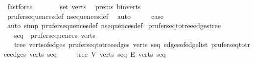 \begin{isabellebody}
\ fastforce\isanewline
\ \ \isamarkupfalse%
\ \isamarkupfalse%
\ {\isachardoublequoteopen}{\isasymdots}\ {\isacharequal}{\kern0pt}\ set\ verts{\isachardoublequoteclose}\ \isamarkupfalse%
\ {\isachardoublequoteopen}{}{\isachardot}{\kern0pt}prems{\isachardoublequoteclose}{\isacharparenleft}{\kern0pt}{}{\isacharparenright}{\kern0pt}\ b{\isacharunderscore}{\kern0pt}in{\isacharunderscore}{\kern0pt}verts\ \isamarkupfalse%
\ prufer{\isacharunderscore}{\kern0pt}sequences{\isacharunderscore}{\kern0pt}def\ n{\isacharunderscore}{\kern0pt}sequences{\isacharunderscore}{\kern0pt}def\ \isamarkupfalse%
\ auto\isanewline
\ \ \isamarkupfalse%
\ \isamarkupfalse%
\ {\isacharquery}{\kern0pt}case\ \isacommand{{\isachardot}{\kern0pt}}\isamarkupfalse%
\isanewline
{}\isamarkupfalse%
\ {\isacharparenleft}{\kern0pt}auto\ simp{\isacharcolon}{\kern0pt}\ prufer{\isacharunderscore}{\kern0pt}sequences{\isacharunderscore}{\kern0pt}def\ n{\isacharunderscore}{\kern0pt}sequences{\isacharunderscore}{\kern0pt}def{\isacharparenright}{\kern0pt}%
\endisatagproof
{\isafoldproof}%
%
\isadelimproof
\isanewline
%
\endisadelimproof
\isanewline
{}\isamarkupfalse%
\ prufer{\isacharunderscore}{\kern0pt}seq{\isacharunderscore}{\kern0pt}to{\isacharunderscore}{\kern0pt}tree{\isacharunderscore}{\kern0pt}edges{\isacharunderscore}{\kern0pt}tree{\isacharcolon}{\kern0pt}\isanewline
\ \ \ {\isachardoublequoteopen}seq\ {\isasymin}\ prufer{\isacharunderscore}{\kern0pt}sequences\ verts{\isachardoublequoteclose}\isanewline
\ \ \ {\isachardoublequoteopen}tree\ {\isacharparenleft}{\kern0pt}verts{\isacharunderscore}{\kern0pt}of{\isacharunderscore}{\kern0pt}edges\ {\isacharparenleft}{\kern0pt}prufer{\isacharunderscore}{\kern0pt}seq{\isacharunderscore}{\kern0pt}to{\isacharunderscore}{\kern0pt}tree{\isacharunderscore}{\kern0pt}edges\ verts\ seq{\isacharparenright}{\kern0pt}{\isacharparenright}{\kern0pt}\ {\isacharparenleft}{\kern0pt}edges{\isacharunderscore}{\kern0pt}of{\isacharunderscore}{\kern0pt}edge{\isacharunderscore}{\kern0pt}list\ {\isacharparenleft}{\kern0pt}prufer{\isacharunderscore}{\kern0pt}seq{\isacharunderscore}{\kern0pt}to{\isacharunderscore}{\kern0pt}tree{\isacharunderscore}{\kern0pt}edges\ verts\ seq{\isacharparenright}{\kern0pt}{\isacharparenright}{\kern0pt}{\isachardoublequoteclose}\isanewline
\ \ \ \ {\isacharparenleft}{\kern0pt}\ {\isachardoublequoteopen}tree\ {\isacharparenleft}{\kern0pt}{\isacharquery}{\kern0pt}V\ verts\ seq{\isacharparenright}{\kern0pt}\ {\isacharparenleft}{\kern0pt}{\isacharquery}{\kern0pt}E\ verts\ seq{\isacharparenright}{\kern0pt}{\isachardoublequoteclose}{\isacharparenright}{\kern0pt}\isanewline

\end{isabellebody}
